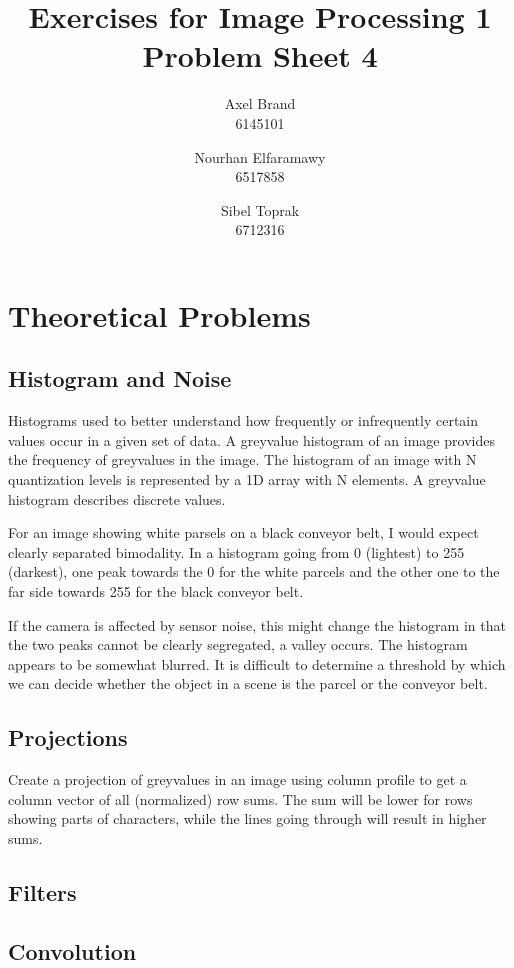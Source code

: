 \documentclass[a4paper,twocolumn]{article}
\title{\textbf{Exercises for Image Processing 1}\\Problem Sheet 4}
\author{Axel Brand\\6145101 \and Nourhan Elfaramawy\\6517858 \and Sibel Toprak\\6712316}
\begin{document}
	\maketitle
	
	\section{Theoretical Problems}
	
	\subsection{Histogram and Noise}
	Histograms used to better understand how frequently or infrequently certain values occur in a given set of data. A greyvalue histogram of an image provides the frequency of greyvalues in the image. The histogram of an image with N quantization levels is represented by a 1D array with N elements. A greyvalue histogram describes discrete values.
	
	For an image showing white parsels on a black conveyor belt, I would expect clearly separated bimodality. In a histogram going from 0 (lightest) to 255 (darkest), one peak towards the 0 for the white parcels and the other one to the far side towards 255 for the black conveyor belt.
	
	If the camera is affected by sensor noise, this might change the histogram in that the two peaks cannot be clearly segregated, a valley occurs. The histogram appears to be somewhat blurred. It is difficult to determine a threshold by which we can decide whether the object in a scene is the parcel or the conveyor belt.
	
	\subsection{Projections}
	
	Create a projection of greyvalues in an image using column profile to get a column vector of all (normalized) row sums. The sum will be lower for rows showing parts of characters, while the lines going through will result in higher sums. 
	
	\subsection{Filters}
	
	\subsection{Convolution}
	
\end{document}
